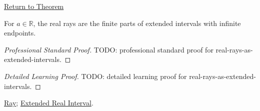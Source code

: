 \newpage
{}
\label{prf:real-rays-as-extended-intervals}
\begin{remark*}[Return]
\hyperref[thm:real-rays-as-extended-intervals]{Return to Theorem}
\end{remark*}
\begin{theorem*}
For $a\in\mathbb{R}$, the real rays are the finite parts of extended intervals
with infinite endpoints.
\end{theorem*}
\begin{proof}[Professional Standard Proof]
\LRAProofBodyStart
TODO: professional standard proof for real-rays-as-extended-intervals.
\end{proof}
\begin{proof}[Detailed Learning Proof]
\LRAProofBodyStart
TODO: detailed learning proof for real-rays-as-extended-intervals.
\end{proof}
\begin{remark*}
\end{remark*}
\begin{dependencies}
\hyperref[def:ray]{Ray};
\hyperref[def:extended-real-interval]{Extended Real Interval}.
\end{dependencies}
\clearpage
